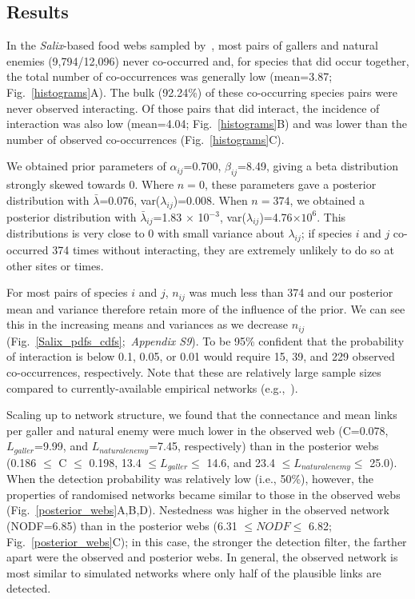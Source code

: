 \documentclass[12pt]{article}
\begin{document}
\begin{spacing}{2.0}
\section*{Results}

  In the \emph{Salix}-based food webs sampled by~\citet{Kopelke2017}, most pairs of gallers and natural enemies (9,794/12,096) never co-occurred and, for species that did occur together, the total number of co-occurrences was generally low (mean=3.87; Fig.~\ref{histograms}A). The bulk (92.24\%) of these co-occurring species pairs were never observed interacting. Of those pairs that did interact, the incidence of interaction was also low (mean=4.04; Fig.~\ref{histograms}B) and was lower than the number of observed co-occurrences (Fig.~\ref{histograms}C).


  We obtained prior parameters of $\alpha_{ij}$=0.700, $\beta_{ij}$=8.49, giving a beta distribution strongly skewed towards 0. Where $n=0$, these parameters gave a posterior distribution with $\bar\lambda$=0.076, var($\lambda_{ij}$)=0.008. When $n=374$, we obtained a posterior distribution with $\bar\lambda_{ij}$=1.83 $\times$ 10$^{-3}$, var($\lambda_{ij}$)=4.76$\times10^6$. This distributions is very close to 0 with small variance about $\lambda_{ij}$; if species $i$ and $j$ co-occurred 374 times without interacting, they are extremely unlikely to do so at other sites or times. 


  For most pairs of species $i$ and $j$, $n_{ij}$ was much less than 374 and our posterior mean and variance therefore retain more of the influence of the prior. We can see this in the increasing means and variances as we decrease $n_{ij}$ (Fig.~\ref{Salix_pdfs_cdfs};~\emph{Appendix S9}). To be 95\% confident that the probability of interaction is below 0.1, 0.05, or 0.01 would require 15, 39, and 229 observed co-occurrences, respectively. Note that these are relatively large sample sizes compared to currently-available empirical networks (e.g.,~\citealp{Morris2014}).


  Scaling up to network structure, we found that the connectance and mean links per galler and natural enemy were much lower in the observed web (C=0.078, $L_{galler}$=9.99, and $L_{natural enemy}$=7.45, respectively) than in the posterior webs (0.186 $\leq$ C $\leq$ 0.198, 13.4 $\leq L_{galler} \leq$ 14.6, and 23.4 $\leq L_{natural enemy} \leq$ 25.0). When the detection probability was relatively low (i.e., 50\%), however, the properties of randomised networks became similar to those in the observed webs (Fig.~\ref{posterior_webs}A,B,D). Nestedness was higher in the observed network (NODF=6.85) than in the posterior webs (6.31 $\leq NODF \leq$ 6.82; Fig.~\ref{posterior_webs}C); in this case, the stronger the detection filter, the farther apart were the observed and posterior webs. In general, the observed network is most similar to simulated networks where only half of the plausible links are detected. 


\end{spacing}
\end{document}
